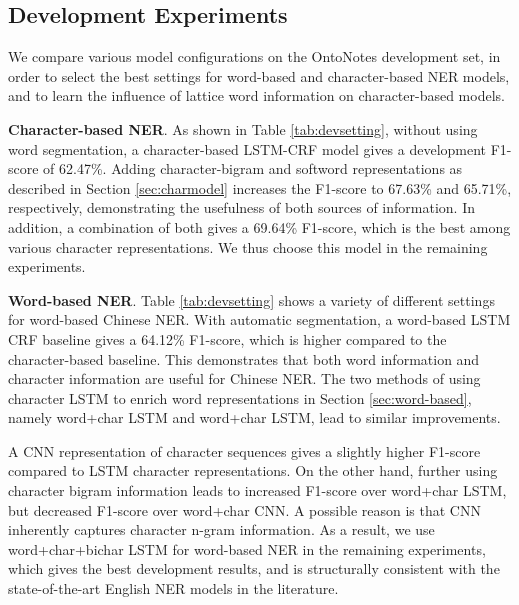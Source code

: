 \documentclass[11pt,a4paper]{article}
\begin{document}
\begin{CJK*}{UTF8}{gbsn}
\subsection{Development Experiments}
We compare various model configurations on the OntoNotes development set, in order to select the best settings for word-based and character-based NER models, and to learn the influence of lattice word information on character-based models.

\textbf{Character-based NER}. As shown in Table \ref{tab:devsetting}, without using word segmentation, a character-based LSTM-CRF model gives a development F1-score of 62.47\%. Adding character-bigram and softword representations as described in Section \ref{sec:charmodel} increases the F1-score to 67.63\% and 65.71\%, respectively, demonstrating the usefulness of both sources of information. In addition, a combination of both gives a 69.64\% F1-score, which is the best among various character representations. We thus choose this model in the remaining experiments. 


\textbf{Word-based NER}. Table \ref{tab:devsetting} shows a variety of different settings for word-based Chinese NER. With automatic segmentation, a word-based LSTM CRF baseline gives a 64.12\% F1-score, which is higher compared to the character-based baseline. This demonstrates that both word information and character information are useful for Chinese NER. The two methods of using character LSTM to enrich word representations in Section \ref{sec:word-based}, namely word+char LSTM and word+char LSTM, lead to similar improvements.

A CNN representation of character sequences gives a slightly higher F1-score compared to LSTM character representations. On the other hand, further using character bigram information leads to increased F1-score over word+char LSTM, but decreased F1-score over word+char CNN. A possible reason is that CNN inherently captures character n-gram information. As a result, we use word+char+bichar LSTM for word-based NER in the remaining experiments, which gives the best development results, and is structurally consistent with the state-of-the-art English NER models in the literature. 




\end{CJK*}
\end{document}
